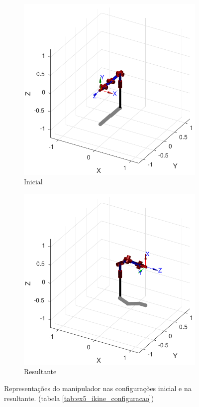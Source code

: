 \documentclass[a4paper,11pt]{article}
\theoremstyle{mytheor}
\begin{document}
\begin{figure}[!ht]
\centering
  \begin{minipage}{\linewidth}
  \centering
    \begin{subfigure}[b]{0.45\textwidth}
    \includegraphics[width=1\textwidth]{figs/ex5_inicial.pdf}
    \caption{Inicial}
    \end{subfigure}
    \begin{subfigure}[b]{0.45\textwidth}
    \includegraphics[width=1\textwidth]{figs/ex5_resposta.pdf}
    \caption{Resultante}
    \end{subfigure}
  \end{minipage}
\caption{Representações do manipulador nas configurações inicial e na resultante. (tabela \ref{tab:ex5_ikine_configuracao})}
\label{fig:ex5_configuracoes}
\end{figure}
\end{document}
